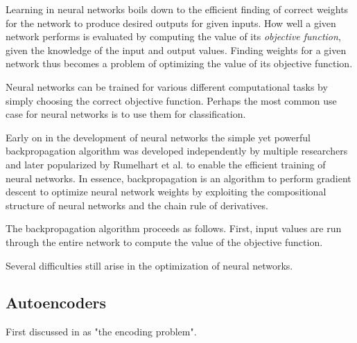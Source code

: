 Learning in neural networks boils down to the efficient finding of correct weights for the network to produce desired outputs for given inputs. How well a given network performs is evaluated by computing the value of its \textit{objective function}, given the knowledge of the input and output values. Finding weights for a given network thus becomes a problem of optimizing the value of its objective function.

Neural networks can be trained for various different computational tasks by simply choosing the correct objective function. Perhaps the most common use case for neural networks is to use them for classification.

Early on in the development of neural networks the simple yet powerful backpropagation algorithm was developed independently by multiple researchers and later popularized by Rumelhart et al. \cite{nature_backprop} to enable the efficient training of neural networks. In essence, backpropagation is an algorithm to perform gradient descent to optimize neural network weights by exploiting the compositional structure of neural networks and the chain rule of derivatives.

The backpropagation algorithm proceeds as follows. First, input values are run through the entire network to compute the value of the objective function. 


Several difficulties still arise in the optimization of neural networks. 

\subsection{Autoencoders}
\label{subsection:autoencoders}

First discussed in \cite{encoding_problem} as "the encoding problem".


